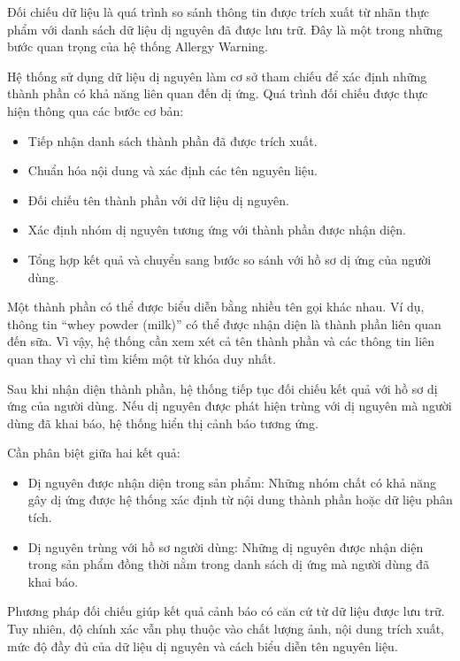 	Đối chiếu dữ liệu là quá trình so sánh thông tin được trích xuất
	từ nhãn thực phẩm với danh sách dữ liệu dị nguyên đã được lưu trữ.
	Đây là một trong những bước quan trọng của hệ thống Allergy Warning.
	
	Hệ thống sử dụng dữ liệu dị nguyên làm cơ sở tham chiếu để xác
	định những thành phần có khả năng liên quan đến dị ứng. Quá trình
	đối chiếu được thực hiện thông qua các bước cơ bản:
	
	\begin{itemize}
		\item Tiếp nhận danh sách thành phần đã được trích xuất.
		\item Chuẩn hóa nội dung và xác định các tên nguyên liệu.
		\item Đối chiếu tên thành phần với dữ liệu dị nguyên.
		\item Xác định nhóm dị nguyên tương ứng với thành phần được nhận diện.
		\item Tổng hợp kết quả và chuyển sang bước so sánh với hồ sơ dị ứng của người dùng.
	\end{itemize}
	
	Một thành phần có thể được biểu diễn bằng nhiều tên gọi khác nhau.
	Ví dụ, thông tin ``whey powder (milk)'' có thể được nhận diện là
	thành phần liên quan đến sữa. Vì vậy, hệ thống cần xem xét cả tên
	thành phần và các thông tin liên quan thay vì chỉ tìm kiếm một
	từ khóa duy nhất.
	
	Sau khi nhận diện thành phần, hệ thống tiếp tục đối chiếu kết quả
	với hồ sơ dị ứng của người dùng. Nếu dị nguyên được phát hiện
	trùng với dị nguyên mà người dùng đã khai báo, hệ thống hiển thị
	cảnh báo tương ứng.
	
	Cần phân biệt giữa hai kết quả:
	
	\begin{itemize}
		\item Dị nguyên được nhận diện trong sản phẩm: Những nhóm chất có khả năng gây dị ứng được hệ thống xác định từ nội dung thành phần hoặc dữ liệu phân tích.
		\item Dị nguyên trùng với hồ sơ người dùng: Những dị nguyên được nhận diện trong sản phẩm đồng thời nằm trong danh sách dị ứng mà người dùng đã khai báo.
	\end{itemize}
	
	Phương pháp đối chiếu giúp kết quả cảnh báo có căn cứ từ dữ liệu
	được lưu trữ. Tuy nhiên, độ chính xác vẫn phụ thuộc vào chất lượng
	ảnh, nội dung trích xuất, mức độ đầy đủ của dữ liệu dị nguyên và
	cách biểu diễn tên nguyên liệu.
	
